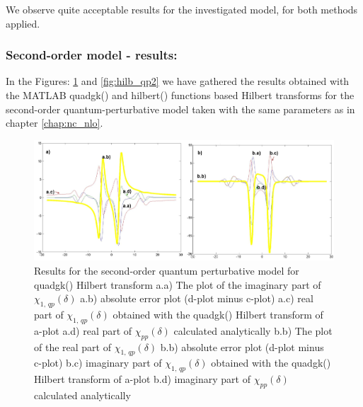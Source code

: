 \documentclass[12pt,twoside,a4paper]{article}
\numberwithin{equation}{subsection}
\numberwithin{figure}{subsection}
\begin{document}
We observe quite acceptable results for the investigated model, for both methods applied. 

\subsubsection*{Second-order model - results:}

In the Figures: \ref{fig:quadgk_qp2} and \ref{fig:hilb_qp2} we have ga\-thered the results ob\-tained with the MATLAB quadgk() and
hilbert() func\-tions based Hil\-bert transforms for the se\-cond\--order quan\-tum\--per\-tur\-bative model taken with the same
para\-meters as in chapter \ref{chap:nc_nlo}.

\begin{figure}
  \includegraphics[width=150mm]{img/quadgk_qp2.png}
  \caption{Results for the second-order quantum perturbative model for quadgk() Hilbert transform
    a.a) The plot of the imaginary part of ${\chi_{1, \,qp}}(\delta )$
    a.b) absolute error plot (d-plot minus c-plot) 
    a.c) real part of ${\chi_{1, \,qp}}(\delta )$ obtained with the quadgk() Hilbert transform of a-plot 
    a.d) real part of ${\chi_{pp}}(\delta )$ calculated analytically 
    b.b) The plot of the real part of ${\chi_{1, \,qp}}(\delta )$ 
    b.b) absolute error plot (d-plot minus c-plot) 
    b.c) imaginary part of ${\chi_{1, \,qp}}(\delta )$ obtained with the quadgk()  Hilbert transform of a-plot 
    b.d) imaginary part of ${\chi_{pp}}(\delta )$ calculated analytically  
    \label{fig:quadgk_qp2}
  }
\end{figure}
\end{document}
